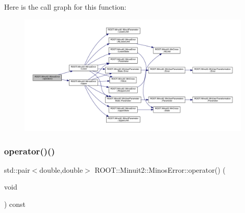 Here is the call graph for this function\+:
\nopagebreak
\begin{figure}[H]
\begin{center}
\leavevmode
\includegraphics[width=350pt]{d2/dd1/classROOT_1_1Minuit2_1_1MinosError_ae5c75a96400736de9741f6c5b8314e31_cgraph}
\end{center}
\end{figure}
\mbox{\label{classROOT_1_1Minuit2_1_1MinosError_ae5c75a96400736de9741f6c5b8314e31}} 
\subsubsection{\texorpdfstring{operator()()}{operator()()}\hspace{0.1cm}{\footnotesize\ttfamily [4/4]}}
{\footnotesize\ttfamily std\+::pair$<$double,double$>$ R\+O\+O\+T\+::\+Minuit2\+::\+Minos\+Error\+::operator() (\begin{DoxyParamCaption}\item[{void}]{ }\end{DoxyParamCaption}) const\hspace{0.3cm}{\ttfamily [inline]}}

